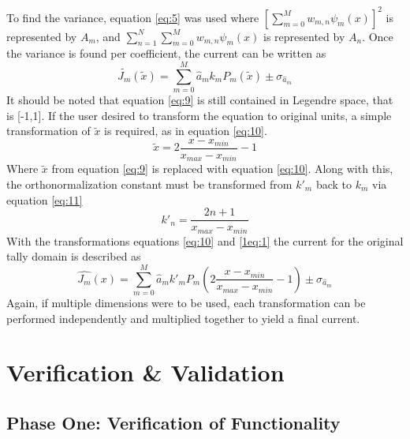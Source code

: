 \documentclass[10tma4paper]{article}
\begin{document}
To find the variance, equation \eqref{eq:5} was used where $[\sum_{m=0}^{M}w_{m,n}\psi_{m}(x)]^{2}$ is represented by $A_{m}$, and $\sum_{n=1}^{N}\sum_{m=0}^{M}w_{m,n}\psi_{m}(x)$ is represented by $A_{n}$. Once the variance is found per coefficient, the current can be written as
\begin{equation}\label{eq:9}
	\tilde{J_{m}}(\tilde{x}) = \sum_{m=0}^{M}\hat{a}_{m}k_{m}P_{m}(\tilde{x}) \pm  \sigma_{\hat{a}_{m}}
\end{equation}
It should be noted that equation \eqref{eq:9} is still contained in Legendre space, that is [-1,1]. If the user desired to transform the equation to original units, a simple transformation of $\tilde{x}$ is required, as in equation \eqref{eq:10}.
\begin{equation}\label{eq:10}
\tilde{x} = 2\frac{x-x_{min}}{x_{max}-x_{min}}-1
\end{equation}
Where $\tilde{x}$ from equation \eqref{eq:9} is replaced with equation \eqref{eq:10}. Along with this, the orthonormalization constant must be transformed from $k'_{m}$ back to $k_{m}$ via equation \eqref{eq:11}
\begin{equation}\label{eq:11}
k'_{n} = \frac{2n+1}{x_{max}-x_{min}}
\end{equation}
With the transformations equations \eqref{eq:10} and \eqref{1eq:1} the current for the original tally domain is described as 
\begin{equation}
	\hat{J_{m}}(x) = \sum_{m=0}^{M}\hat{a}_{m}k'_{m}P_{m}(2\frac{x-x_{min}}{x_{max}-x_{min}}-1) \pm  \sigma_{\hat{a}_{m}}
\end{equation}
Again, if multiple dimensions were to be used, each transformation can be performed independently and multiplied together to yield a final current.
\section{Verification \& Validation}\label{vv}
\subsection{Phase One: Verification of Functionality}\label{P1}
\end{document}
